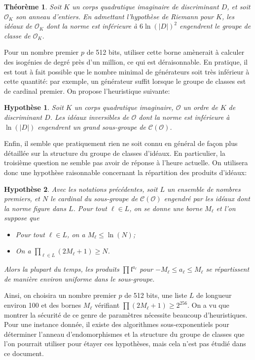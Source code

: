 \documentclass[11pt,a4paper]{article}
\renewcommand{\O}{\mathcal{O}}
\newcommand{\Cl}{\mathcal{C}}
\renewcommand{\frak}{\mathfrak}
\renewcommand{\v}{\vspace{5mm}}
\newtheorem*{thm}{Théorème}
\newtheorem*{hyp}{Hypothèse}
\theoremstyle{definition}
\begin{document}
\begin{thm}
Soit $K$ un corps quadratique imaginaire de discriminant $D$, et soit $\O_K$ son anneau d'entiers. En admettant l'hypothèse de Riemann pour $K$, les idéaux de $\O_K$ dont la norme est inférieure à $6\ln(|D|)^2$ engendrent le groupe de classe de $\O_K$.
\end{thm}

Pour un nombre premier $p$ de 512 bits, utiliser cette borne amènerait à calculer des isogénies de degré près d'un million, ce qui est déraisonnable. En pratique, il est tout à fait possible que le nombre minimal de générateurs soit très inférieur à cette quantité: par exemple, un générateur suffit lorsque le groupe de classes est de cardinal premier. On propose l'heuristique suivante:

\begin{hyp}
Soit $K$ un corps quadratique imaginaire, $\O$ un ordre de $K$ de discriminant $D$. Les idéaux inversibles de $\O$ dont la norme est inférieure à $\ln(|D|)$ engendrent un grand sous-groupe de $\Cl(\O)$.
\end{hyp}

\v
Enfin, il semble que pratiquement rien ne soit connu en général de façon plus détaillée sur la structure du groupe de classes d'idéaux. En particulier, la troisième question ne semble pas avoir de réponse à l'heure actuelle. On utilisera donc une hypothèse raisonnable concernant la répartition des produits d'idéaux:
\begin{hyp}
Avec les notations précédentes, soit $L$ un ensemble de nombres premiers, et $N$ le cardinal du sous-groupe de $\Cl(\O)$ engendré par les idéaux dont la norme figure dans $L$. Pour tout $\ell\in L$, on se donne une borne $M_\ell$ et l'on suppose que
\begin{itemize}
\item[•] Pour tout $\ell\in L$, on a $M_\ell \leq \ln(N)$;
\item[•] On a $\prod_{\ell\in L} (2M_\ell + 1) \geq N$.
\end{itemize}
Alors la plupart du temps, les produits $\prod {\frak l}^{a_\ell}$ pour $-M_\ell \leq a_\ell\leq M_\ell$ se répartissent de manière environ uniforme dans le sous-groupe.
\end{hyp}

\v
Ainsi, on choisira un nombre premier $p$ de 512 bits, une liste $L$ de longueur environ 100 et des bornes $M_\ell$ vérifiant $\prod (2 M_\ell +1) \geq 2^{256}$. On a vu que montrer la sécurité de ce genre de paramètres nécessite beaucoup d'heuristiques. Pour une instance donnée, il existe des algorithmes sous-exponentiels pour déterminer l'anneau d'endomorphismes et la structure du groupe de classes que l'on pourrait utiliser pour étayer ces hypothèses, mais cela n'est pas étudié dans ce document.
\end{document}
